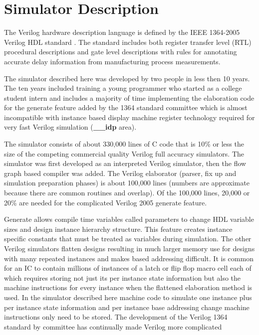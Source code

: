 \documentclass[preprint, authoryear]{sigplanconf}
\begin{document}
\section{Simulator Description}
\par
The Verilog hardware description language is defined by the IEEE 1364-2005
Verilog HDL standard \cite{IEEE2005}.  The standard includes
both register transfer level (RTL) procedural descriptions and
gate level descriptions with rules for annotating accurate delay information
from manufacturing process measurements.
\par
The simulator described here was developed by two people in less
then 10 years.  The ten years included training a young programmer who
started as a college student intern and includes a majority 
of time implementing the elaboration code for the generate feature added
by the 1364 standard committee which is almost incompatible with
instance based display machine register technology required for
very fast Verilog simulation (\textbf{__idp} area).
\par
The simulator consists of about 330,000 lines of C code that is 10\%
or less the size of the competing commercial quality Verilog
full accuracy simulators.  The simulator was first developed as an interpreted
Verilog simulator, then the flow graph based compiler was added.
The Verilog elaborator (parser, fix up and simulation 
preparation phases) is about 100,000 lines (numbers are approximate
because there are common routines and overlap).  Of the 100,000 lines,
20,000 or 20\% are needed for the complicated Verilog 2005 generate feature.
\par
Generate allows compile time variables called parameters to
change HDL variable sizes and design instance hierarchy structure.
This feature creates instance specific constants that must be
treated as variables during simulation.
The other Verilog simulators flatten designs resulting in
much larger memory use for designs with many repeated instances
and makes based addressing difficult.
It is common for an IC to contain millions of instances of a latch
or flip flop macro cell each of which requires storing not just its
per instance state information but also the machine instructions
for every instance when the flattened elaboration method is used.
In the simulator described here machine code to simulate one instance
plus per instance state information and per instance base addressing change
machine instructions only need to be stored.
The development of the Verilog 1364 standard
by committee has continually made Verilog more complicated
\end{document}
